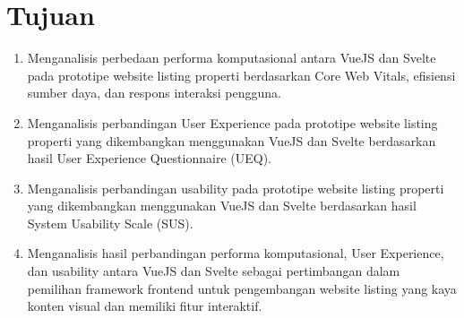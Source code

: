 \documentclass[12pt,a4paper]{report}
\begin{document}
\section{Tujuan}
\begin{enumerate}
    \item Menganalisis perbedaan performa komputasional antara VueJS dan Svelte pada prototipe website listing properti berdasarkan Core Web Vitals, efisiensi sumber daya, dan respons interaksi pengguna.
    \item Menganalisis perbandingan User Experience pada prototipe website listing properti yang dikembangkan menggunakan VueJS dan Svelte berdasarkan hasil User Experience Questionnaire (UEQ).
    \item Menganalisis perbandingan usability pada prototipe website listing properti yang dikembangkan menggunakan VueJS dan Svelte berdasarkan hasil System Usability Scale (SUS).
    \item Menganalisis hasil perbandingan performa komputasional, User Experience, dan usability antara VueJS dan Svelte sebagai pertimbangan dalam pemilihan framework frontend untuk pengembangan website listing yang kaya konten visual dan memiliki fitur interaktif.
\end{enumerate}
\end{document}

